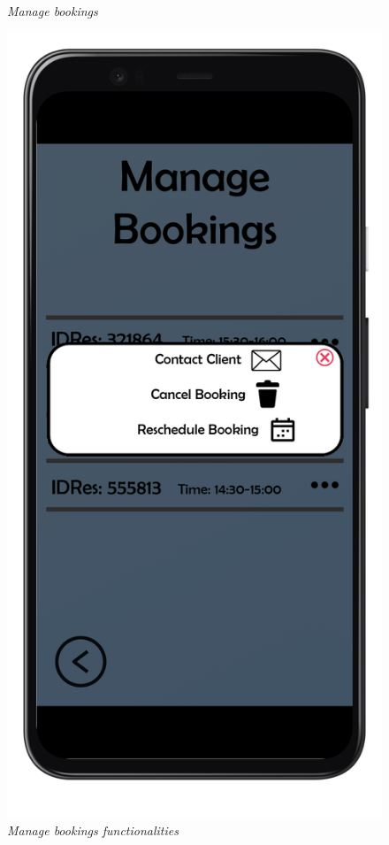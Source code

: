 \documentclass{article}
\begin{document}
\begin{figure}[!h]
\begin{minipage}[!h]{0.4\textwidth}
				\caption{\emph{Manage bookings}}
			\end{minipage}
			\hfill
			\begin{minipage}[!h]{0.4\textwidth}
				\includegraphics[width=\textwidth]{../Mockups/MBpopup.png}
				\caption{\emph{Manage bookings functionalities}}
			\end{minipage}
		\end{figure}
\end{document}
